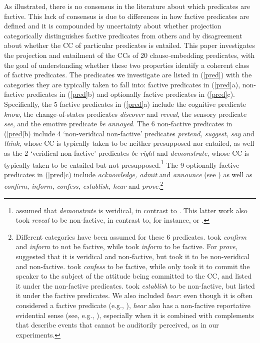 \documentclass[11pt,fleqn]{article}
\newcommand{\6}{\mbox{$[\hspace*{-.6mm}[$}}
\newcommand{\9}{\mbox{$]\hspace*{-.6mm}]$}}
\begin{document}
As illustrated, there is no consensus in the literature about which predicates are factive. This lack of consensus is due to differences in how factive predicates are defined and it is compounded by uncertainty about whether projection categorically distinguishes factive predicates from others and by disagreement about whether the CC of particular predicates is entailed. This paper investigates the projection and entailment of the CCs of 20 clause-embedding predicates, with the goal of understanding whether these two properties identify a coherent class of factive predicates. The predicates we investigate are listed in (\ref{pred}) with the categories they are typically taken to fall into: factive predicates in (\ref{pred}a), non-factive predicates in (\ref{pred}b) and optionally factive predicates in (\ref{pred}c). Specifically, the 5 factive predicates in (\ref{pred}a) include the cognitive predicate {\em know}, the change-of-states predicates {\em discover} and {\em reveal}, the sensory predicate {\em see}, and the emotive predicate {\em be annoyed}. The 6 non-factive predicates in (\ref{pred}b) include 4 `non-veridical non-factive' predicates {\em pretend, suggest, say} and {\em think}, whose CC is typically taken to be neither presupposed nor entailed, as well as  the 2 `veridical non-factive' predicates {\em be right} and {\em demonstrate}, whose CC is typically taken to be entailed but not presupposed.\footnote{\citet{anand-hacquard2014} assumed that {\em demonstrate} is veridical, in contrast to \citealt{anand-etal2019}. This latter work also took {\em reveal} to be non-factive, in contrast to, for instance, \citealt{egre2008,wyse} or \citealt{tbd-variability}.}  The 9 optionally factive predicates in (\ref{pred}c) include {\em acknowledge, admit} and {\em announce} (see \citealt{kiparsky-kiparsky70}) as well as {\em confirm, inform, confess, establish, hear} and {\em prove}.\footnote{Different categories have been assumed for these 6 predicates. \citet{anand-hacquard2014} took {\em confirm} and {\em inform}  to not be factive, while \citet{schlenker10} took {\em inform} to be factive. For {\em prove}, \citet{white-rawlins-nels2018} suggested that it is veridical and non-factive, but \citet{anand-hacquard2014} took it to be non-veridical and non-factive. \citet{swanson2012}  took {\em confess} to be factive, while \citet{karttunen2016} only took it to commit the speaker to the subject of the attitude being committed to the CC, and \citet{wyse} listed it under the non-factive predicates. \citet{swanson2012} took  {\em establish} to be non-factive, but \citet{wyse} listed it under the factive predicates. We also included {\em hear}: even though it is often considered a factive predicate (e.g., \citealt{beaver-belly,anand-hacquard2014}), {\em hear} also has a non-factive reportative evidential sense (see, e.g., \citealt{anderson86,simons07}), especially when it is combined with complements that describe events that cannot be auditorily perceived, as in our experiments.}
\end{document}
